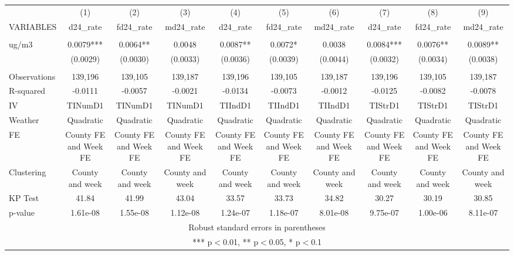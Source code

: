 \begin{tabular}{lccccccccc} \hline
 & (1) & (2) & (3) & (4) & (5) & (6) & (7) & (8) & (9) \\
VARIABLES & d24\_rate & fd24\_rate & md24\_rate & d24\_rate & fd24\_rate & md24\_rate & d24\_rate & fd24\_rate & md24\_rate \\ \hline
 &  &  &  &  &  &  &  &  &  \\
ug/m3 & 0.0079*** & 0.0064** & 0.0048 & 0.0087** & 0.0072* & 0.0038 & 0.0084*** & 0.0076** & 0.0089** \\
 & (0.0029) & (0.0030) & (0.0033) & (0.0036) & (0.0039) & (0.0044) & (0.0032) & (0.0034) & (0.0038) \\
 &  &  &  &  &  &  &  &  &  \\
Observations & 139,196 & 139,105 & 139,187 & 139,196 & 139,105 & 139,187 & 139,196 & 139,105 & 139,187 \\
R-squared & -0.0111 & -0.0057 & -0.0021 & -0.0134 & -0.0073 & -0.0012 & -0.0125 & -0.0082 & -0.0078 \\
IV & TINumD1 & TINumD1 & TINumD1 & TIIndD1 & TIIndD1 & TIIndD1 & TIStrD1 & TIStrD1 & TIStrD1 \\
Weather & Quadratic & Quadratic & Quadratic & Quadratic & Quadratic & Quadratic & Quadratic & Quadratic & Quadratic \\
FE & County FE and Week FE & County FE and Week FE & County FE and Week FE & County FE and Week FE & County FE and Week FE & County FE and Week FE & County FE and Week FE & County FE and Week FE & County FE and Week FE \\
Clustering & County and week & County and week & County and week & County and week & County and week & County and week & County and week & County and week & County and week \\
KP Test & 41.84 & 41.99 & 43.04 & 33.57 & 33.73 & 34.82 & 30.27 & 30.19 & 30.85 \\
 p-value & 1.61e-08 & 1.55e-08 & 1.12e-08 & 1.24e-07 & 1.18e-07 & 8.01e-08 & 9.75e-07 & 1.00e-06 & 8.11e-07 \\ \hline
\multicolumn{10}{c}{ Robust standard errors in parentheses} \\
\multicolumn{10}{c}{ *** p$<$0.01, ** p$<$0.05, * p$<$0.1} \\
\end{tabular}
